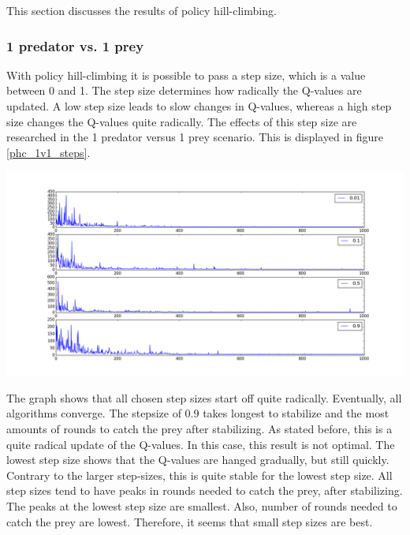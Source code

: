 This section discusses the results of policy hill-climbing.

\subsubsection{1 predator vs. 1 prey}
With policy hill-climbing it is possible to pass a step size, which is a value between 0 and 1. The step size determines how radically the Q-values are updated. A low step size leads to slow changes in Q-values, whereas a high step size changes the Q-values quite radically. The effects of this step size are researched in the 1 predator versus 1 prey scenario. This is displayed in figure \ref{phc_1v1_steps}.

\begin{center}
	\includegraphics[scale=0.3]{allplots_hillclimbing}
	\label{graph:phc_1v1_steps}
\end{center}

The graph shows that all chosen step sizes start off quite radically. Eventually, all algorithms converge. The stepsize of 0.9 takes longest to stabilize and the most amounts of rounds to catch the prey after stabilizing. As stated before, this is a quite radical update of the Q-values. In this case, this result is not optimal. The lowest step size shows that the Q-values are hanged gradually, but still quickly. Contrary to the larger step-sizes, this is quite stable for the lowest step size. All step sizes tend to have peaks in rounds needed to catch the prey, after stabilizing. The peaks at the lowest step size are smallest. Also, number of rounds needed to catch the prey are lowest. Therefore, it seems that small step sizes are best.
